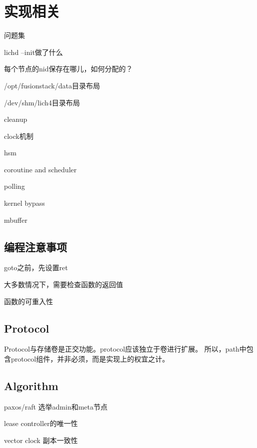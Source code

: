 \chapter{实现相关}

问题集
\begin{enumbox}
\item lichd --init做了什么
\item 每个节点的nid保存在哪儿，如何分配的？
\item /opt/fusionstack/data目录布局
\item /dev/shm/lich4目录布局
\item cleanup
\item clock机制
\item hsm
\end{enumbox}

\begin{compactitem}
\item coroutine and scheduler
\item polling 
\item kernel bypass
\item mbuffer
\end{compactitem}

\section{编程注意事项}

\begin{compactitem}
\item goto之前，先设置ret
\item 大多数情况下，需要检查函数的返回值
\item 函数的可重入性
\end{compactitem}

\section{Protocol}

Protocol与存储卷是正交功能。protocol应该独立于卷进行扩展。
所以，path中包含protocol组件，并非必须，而是实现上的权宜之计。

\section{Algorithm}

\begin{compactitem}
    \item paxos/raft 选举admin和meta节点
    \item lease controller的唯一性
    \item vector clock 副本一致性
\end{compactitem}

